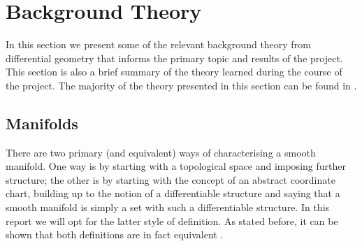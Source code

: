 \section{Background Theory}
In this section we present some of the relevant background theory from differential geometry that informs the primary topic and results of the project. This section is also a brief summary of the theory learned during the course of the project. The majority of the theory presented in this section can be found in \cite{andrews,burger2016riemannian,hitchin_2012,MR2954043}.
\subsection{Manifolds}
There are two primary (and equivalent) ways of characterising a smooth manifold. One way is by starting with a topological space and imposing further structure; the other is by starting with the concept of an abstract coordinate chart, building up to the notion of a differentiable structure and saying that a smooth manifold is simply a set with such a differentiable structure. In this report we will opt for the latter style of definition. As stated before, it can be shown that both definitions are in fact equivalent \cite{MR2954043,MR2766102}.\\

